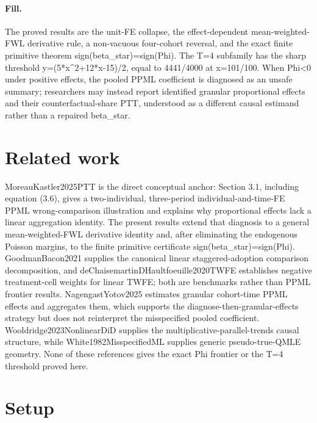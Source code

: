 \documentclass{article}
\begin{document}
\paragraph{Fill.} The proved results are the unit-FE collapse, the effect-dependent mean-weighted-FWL derivative rule, a non-vacuous four-cohort reversal, and the exact finite primitive theorem sign(beta_star)=sign(Phi). The T=4 subfamily has the sharp threshold y=(5*x^2+12*x-15)/2, equal to 4441/4000 at x=101/100. When Phi<0 under positive effects, the pooled PPML coefficient is diagnosed as an unsafe summary; researchers may instead report identified granular proportional effects and their counterfactual-share PTT, understood as a different causal estimand rather than a repaired beta_star.

\section{Related work}

MoreauKastler2025PTT is the direct conceptual anchor: Section 3.1, including equation (3.6), gives a two-individual, three-period individual-and-time-FE PPML wrong-comparison illustration and explains why proportional effects lack a linear aggregation identity. The present results extend that diagnosis to a general mean-weighted-FWL derivative identity and, after eliminating the endogenous Poisson margins, to the finite primitive certificate sign(beta_star)=sign(Phi). GoodmanBacon2021 supplies the canonical linear staggered-adoption comparison decomposition, and deChaisemartinDHaultfoeuille2020TWFE establishes negative treatment-cell weights for linear TWFE; both are benchmarks rather than PPML frontier results. NagengastYotov2025 estimates granular cohort-time PPML effects and aggregates them, which supports the diagnose-then-granular-effects strategy but does not reinterpret the misspecified pooled coefficient. Wooldridge2023NonlinearDiD supplies the multiplicative-parallel-trends causal structure, while White1982MisspecifiedML supplies generic pseudo-true-QMLE geometry. None of these references gives the exact Phi frontier or the T=4 threshold proved here.

\section{Setup}
\end{document}
